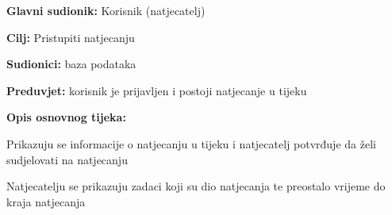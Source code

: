					\noindent {}
					\begin{packed_item}
						
						\item \textbf{Glavni sudionik: }Korisnik (natjecatelj)
						\item \textbf{Cilj:} Pristupiti natjecanju 
						\item \textbf{Sudionici:} baza podataka
						\item \textbf{Preduvjet:} korisnik je prijavljen i postoji natjecanje u tijeku
						\item \textbf{Opis osnovnog tijeka:}
						
						\item[] \begin{packed_enum}
							\item Prikazuju se informacije o natjecanju u tijeku i natjecatelj potvrđuje da želi sudjelovati na natjecanju 
							\item Natjecatelju se prikazuju zadaci koji su dio natjecanja te preostalo vrijeme do kraja natjecanja
						\end{packed_enum}
					\end{packed_item}
								
					
					
